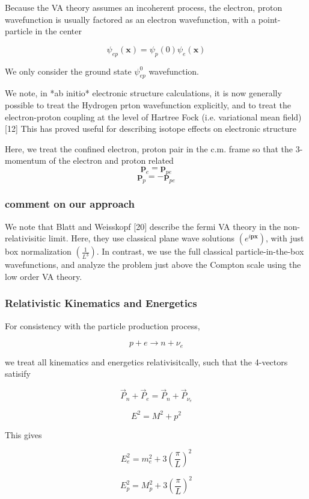 \documentclass[11pt]{amsart}
\begin{document}
Because the VA theory assumes an incoherent process, the electron, proton wavefunction is usually factored as an electron wavefunction, with a point-particle in the center

$$\psi_{ep}(\mathbf{x})=\psi_{p}(0)\psi_{e}(\mathbf{x})$$

We only consider the  ground state $\psi_{ep}^{0}$ wavefunction.


We note, in *ab initio* electronic structure calculations, it is now generally possible to treat the Hydrogen prton wavefunction explicitly, and to treat the electron-proton coupling at the level of Hartree Fock (i.e. variational mean field) [12] This has proved useful for describing isotope effects on electronic structure

Here, we treat the confined electron, proton pair in the c.m. frame so that the 3-momentum of the electron and proton related
$$\mathbf{p}_{e}=\mathbf{p}_{pe}$$
$$\mathbf{p}_{p}=-\mathbf{p}_{pe}$$

\subsubsection{comment on our approach}

We note that Blatt and Weisskopf [20] describe the fermi VA theory in the non-relativisitic limit.  Here, they use classical plane wave solutions $(e^{i\mathbf{p}\mathbf{x}})$, with just box normalization $(\frac{1}{L^{3}})$.  In contrast, we use the full classical particle-in-the-box wavefunctions, and analyze the problem just above the Compton scale using the low order VA theory.

\subsubsection{Relativistic Kinematics and Energetics}
For consistency with the particle production process,

$$ p+e\rightarrow n+\nu_{e} $$

we treat all kinematics and energetics relativisitcally, such that the 4-vectors satisify

$$\overrightarrow{P}_{n}+\overrightarrow{P}_{e}=\overrightarrow{P}_{n}+\overrightarrow{P}_{\nu_{e}} $$

$$E^{2}=M^{2}+p^{2}$$

This gives

$$E^{2}_{e}=m^{2}_{e}+3\left(\dfrac{\pi}{L}\right)^{2}$$ 

$$E^{2}_{p}=M^{2}_{p}+3\left(\dfrac{\pi}{L}\right)^{2}$$
\end{document}
